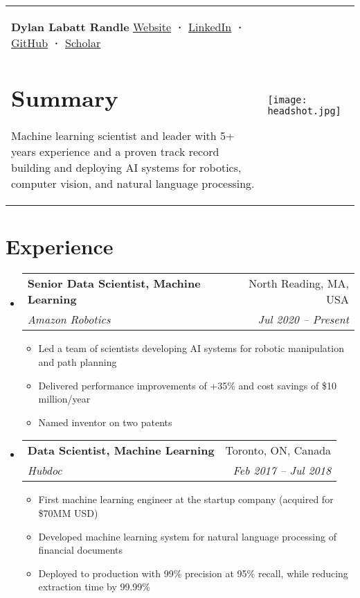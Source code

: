 \documentclass[a4paper,11pt]{article}
\makeatletter
\newcommand{\resumeItem}[1]{
  \item\small{#1}
}
\newcommand{\resumeItemListStart}{\begin{itemize}[rightmargin=0.11in]}
\newcommand{\resumeItemListEnd}{\end{itemize}}
\newcommand{\resumeQuadHeading}[4]{
  \item
  \begin{tabular*}{0.96\textwidth}[t]{l@{\extracolsep{\fill}}r}
    \textbf{#1} & #2 \\
    \textit{\small#3} & \textit{\small #4} \\
  \end{tabular*}
}
\newcommand{\resumeHeadingListStart}{
  \begin{itemize}[leftmargin=0.15in, label={}]
}
\newcommand{\resumeHeadingListEnd}{\end{itemize}}
\makeatother
\begin{document}
\begin{tabularx}{\linewidth}{@{}m{} m{}@{}}
{
    \textbf{\Huge Dylan Labatt Randle \vspace{2pt}} \newline
    \href{https://dylanrandle.github.io/}{\uline{Website}} \textbf{·}
    \href{https://linkedin.com/in/dylanrandle}{\uline{LinkedIn}} \textbf{·}
    \href{https://github.com/dylanrandle}{\uline{GitHub}} \textbf{·}
    \href{https://scholar.google.com/citations?user=62z1l9cAAAAJ}{\uline{Scholar}}
    \section{Summary}
    \small{
      Machine learning scientist and leader with 5+ years experience and a proven track record building and deploying AI systems for robotics, computer vision, and natural language processing.
    }
} & 
{
    \hfill
    \texttt{[image: headshot.jpg]}
}
\end{tabularx}


\section{Experience}
\resumeHeadingListStart{}
  \resumeQuadHeading{Senior Data Scientist, Machine Learning}{North Reading, MA, USA}
  {Amazon Robotics}{Jul 2020 -- Present}
    \resumeItemListStart{}
      \resumeItem{Led a team of scientists developing AI systems for robotic manipulation and path planning}
      \resumeItem{Delivered performance improvements of +35\% and cost savings of \$10 million/year}
      \resumeItem{Named inventor on two patents}
    \resumeItemListEnd{}
  \resumeQuadHeading{Data Scientist, Machine Learning}{Toronto, ON, Canada}
  {Hubdoc}{Feb 2017 -- Jul 2018}
    \resumeItemListStart{}
        \resumeItem{First machine learning engineer at the startup company (acquired for \$70MM USD)}
        \resumeItem{Developed machine learning system for natural language processing of financial documents}
        \resumeItem{Deployed to production with 99\% precision at 95\% recall, while reducing extraction time by 99.99\%}
    \resumeItemListEnd{}
\resumeHeadingListEnd{}
\end{document}
